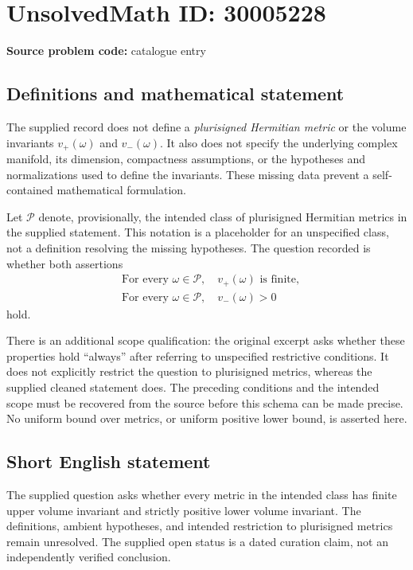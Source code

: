 \documentclass[11pt]{article}
\begin{document}
\section*{UnsolvedMath ID: 30005228}
\textbf{Source problem code:} catalogue entry
\subsection{Definitions and mathematical statement}
The supplied record does not define a \emph{plurisigned Hermitian metric} or the volume invariants \(v_+(\omega)\) and \(v_-(\omega)\). It also does not specify the underlying complex manifold, its dimension, compactness assumptions, or the hypotheses and normalizations used to define the invariants. These missing data prevent a self-contained mathematical formulation.

Let \(\mathcal{P}\) denote, provisionally, the intended class of plurisigned Hermitian metrics in the supplied statement. This notation is a placeholder for an unspecified class, not a definition resolving the missing hypotheses. The question recorded is whether both assertions
\[
\begin{aligned}
&\text{For every }\omega\in\mathcal{P},\quad v_+(\omega)\text{ is finite},\\
&\text{For every }\omega\in\mathcal{P},\quad v_-(\omega)>0
\end{aligned}
\]
hold.

There is an additional scope qualification: the original excerpt asks whether these properties hold ``always'' after referring to unspecified restrictive conditions. It does not explicitly restrict the question to plurisigned metrics, whereas the supplied cleaned statement does. The preceding conditions and the intended scope must be recovered from the source before this schema can be made precise. No uniform bound over metrics, or uniform positive lower bound, is asserted here.
\subsection{Short English statement}
The supplied question asks whether every metric in the intended class has finite upper volume invariant and strictly positive lower volume invariant. The definitions, ambient hypotheses, and intended restriction to plurisigned metrics remain unresolved. The supplied open status is a dated curation claim, not an independently verified conclusion.
\end{document}
